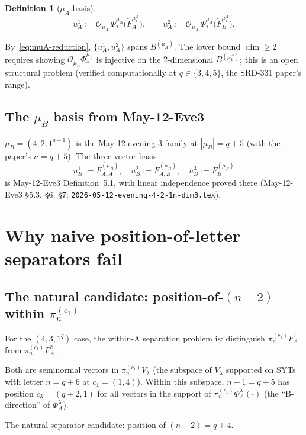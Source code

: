 \documentclass[11pt]{article}
\theoremstyle{definition}
\newtheorem{definition}[theorem]{Definition}
\begin{document}
\begin{definition}[$\mu_A$-basis]\label{def:muA-basis}
\[
   u_A^1 := \mathcal{O}_{\mu_A}\, \Phi_*^{\mu_A}\big(\widetilde F_A^{\mu_1^A}\big),
   \qquad
   u_A^2 := \mathcal{O}_{\mu_A}\, \Phi_*^{\mu_A}\big(\widetilde F_B^{\mu_1^A}\big).
\]
\end{definition}

By~\eqref{eq:muA-reduction}, $\{u_A^1, u_A^2\}$ spans $B^{(\mu_A)}$.
The lower bound $\dim \ge 2$ requires showing
$\mathcal{O}_{\mu_A} \Phi_*^{\mu_A}$ is injective on the
$2$-dimensional $B^{(\mu_1^A)}$; this is an open structural problem
(verified computationally at $q \in \{3, 4, 5\}$, the SRD-331 paper's
range).

\subsection{The $\mu_B$ basis from May-12-Eve3}\label{sec:muB-basis}

$\mu_B = (4, 2, 1^{q-1})$ is the May-12 evening-3 family at
$|\mu_B| = q+5$ (with the paper's $n = q+5$). The three-vector basis
\[
   u_B^1 := F_{A,A}^{(\mu_B)}, \quad
   u_B^2 := F_{A,B}^{(\mu_B)}, \quad
   u_B^3 := F_B^{(\mu_B)}
\]
is May-12-Eve3 Definition~5.1, with linear independence proved there
(May-12-Eve3 \S5.3, \S6, \S7; \texttt{2026-05-12-evening-4-2-1n-dim3.tex}).

\section{Why naive position-of-letter separators fail}\label{sec:obstruction}

\subsection{The natural candidate: position-of-$(n-2)$ within $\pi^{(c_1)}_n$}

For the $(4, 3, 1^q)$ case, the within-A separation problem is:
distinguish $\pi^{(c_1)}_n F_A^1$ from $\pi^{(c_1)}_n F_A^2$.

Both are seminormal vectors in $\pi^{(c_1)}_n V_\lambda$ (the subspace
of $V_\lambda$ supported on SYTs with letter $n = q+6$ at
$c_1 = (1, 4)$). Within this subspace, $n - 1 = q+5$ has position
$c_3 = (q+2, 1)$ for all vectors in the support of
$\pi^{(c_1)}_n \Phi_A^\lambda(\cdot)$ (the ``B-direction'' of
$\Phi_A^\lambda$).

The natural separator candidate: position-of-$(n-2) = q+4$.
\end{document}
